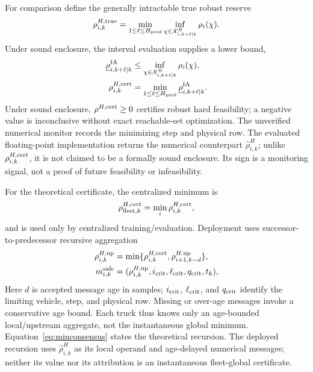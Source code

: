 For comparison define the generally intractable true robust reserve
\begin{equation}
\rho_{i,k}^{H,{\rm true}}=\min_{1\le\ell\le H_{\rm pred}}\inf_{\chi\in\mathcal X^B_{i,k+\ell\mid k}}\rho_i(\chi).
\end{equation}
Under sound enclosure, the interval evaluation supplies a lower bound,
\begin{align}
\underline\rho^{\rm IA}_{i,k+\ell\mid k}
&\le\inf_{\chi\in\mathcal X^B_{i,k+\ell\mid k}}\rho_i(\chi),\label{eq:predlower}\\
\rho_{i,k}^{H,{\rm cert}}
&=\min_{1\le\ell\le H_{\rm pred}}\underline\rho^{\rm IA}_{i,k+\ell\mid k}.\label{eq:rhocert}
\end{align}
Under sound enclosure, $\rho^{H,{\rm cert}}\ge0$ certifies robust hard feasibility; a negative value is inconclusive without exact reachable-set optimization. The unverified numerical monitor records the minimizing step and physical row.
The evaluated floating-point implementation returns the numerical counterpart $\widehat{\rho}_{i,k}^{H}$; unlike $\rho_{i,k}^{H,{\rm cert}}$, it is not claimed to be a formally sound enclosure. Its sign is a monitoring signal, not a proof of future feasibility or infeasibility.

For the theoretical certificate, the centralized minimum is
\begin{equation}\label{eq:fleetreserve}
\rho_{{\rm fleet},k}^{H,{\rm cert}}=\min_i\rho_{i,k}^{H,{\rm cert}},
\end{equation}
and is used only by centralized training/evaluation. Deployment uses successor-to-predecessor recursive aggregation
\begin{align}
\rho_{i,k}^{H,{\rm up}}&=\min\{\rho_{i,k}^{H,{\rm cert}},\rho_{i+1,k-d}^{H,{\rm up}}\},\label{eq:minconsensus}\\
m_{i,k}^{\rm safe}&=(\rho_{i,k}^{H,{\rm up}},i_{\rm crit},\ell_{\rm crit},q_{\rm crit},t_k),
\end{align}
Here $d$ is accepted message age in samples; $i_{\rm crit}$, $\ell_{\rm crit}$, and $q_{\rm crit}$ identify the limiting vehicle, step, and physical row. Missing or over-age messages invoke a conservative age bound. Each truck thus knows only an age-bounded local/upstream aggregate, not the instantaneous global minimum.
Equation~\eqref{eq:minconsensus} states the theoretical recursion. The deployed recursion uses $\widehat{\rho}_{i,k}^{H}$ as its local operand and age-delayed numerical messages; neither its value nor its attribution is an instantaneous fleet-global certificate.

